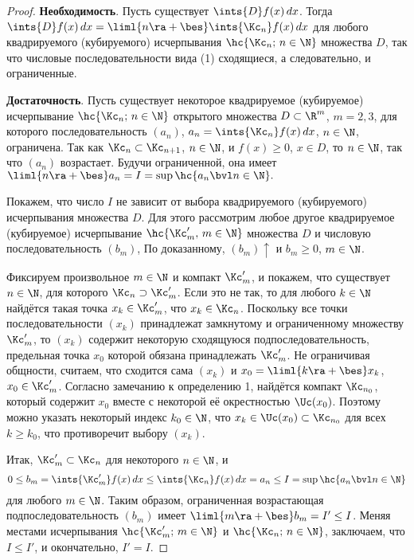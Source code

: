 \documentclass[a4paper]{article}
\begin{document}
\begin{proof}
\textbf{Необходимость}. Пусть существует $\ints{D}f(x)\,dx$. Тогда
$\ints{D}f(x)\,dx=\liml{n\ra+\bes}\ints{\Kc_n}f(x)\,dx$ для любого
квадрируемого (кубируемого) исчерпывания $\hc{\Kc_n;\,n\in\N}$
множества $D$, так что числовые последовательности вида (1)
сходящиеся, а следовательно, и ограниченные.

\textbf{Достаточность}. Пусть существует некоторое квадрируемое
(кубируемое) исчерпывание $\hc{\Kc_n;\,n\in\N}$ открытого множества
$D\subset\R^m$, $m=2,3$, для которого последовательность $(a_n)$,
$a_n=\ints{\Kc_n}f(x)\,dx$, $n\in\N$, ограничена. Так как
$\Kc_n\subset\Kc_{n+1}$, $n\in\N$, и $f(x)\ge0$, $x\in D$, то
 $n\in\N$, так что $(a_n)$ возрастает. Будучи ограниченной,
она имеет $\liml{n\ra+\bes}a_n=I=\sup\hc{a_n\bvl n\in\N}.$

Покажем, что число $I$ не зависит от выбора квадрируемого
(кубируемого) исчерпывания множества $D$. Для этого рассмотрим любое
другое квадрируемое (кубируемое) исчерпывание $\hc{\Kc'_m,
\,m\in\N}$ множества $D$ и числовую последовательность $(b_m)$,
 По доказанному,
$(b_m)\uparrow$ и $b_m\ge0$, $m\in\N$.

Фиксируем произвольное $m\in\N$ и компакт $\Kc'_m$, и покажем, что
существует $n\in\N$, для которого $\Kc_n\supset\Kc'_m$. Если это не
так, то для любого $k\in\N$ найдётся такая точка $x_k\in\Kc'_m$, что
$x_k\in\Kc_n$. Поскольку все точки последовательности $(x_k)$
принадлежат замкнутому и ограниченному множеству $\Kc'_m$, то
$(x_k)$ содержит некоторую сходящуюся подпоследовательность,
предельная точка $x_0$ которой обязана принадлежать $\Kc'_m$. Не
ограничивая общности, считаем, что сходится сама $(x_k)$ и
$x_0=\liml{k\ra+\bes} x_k$, $x_0\in\Kc'_m$. Согласно замечанию к
определению 1, найдётся компакт $\Kc_{n_0}$, который содержит $x_0$
вместе с некоторой её окрестностью $\Uc(x_0)$. Поэтому можно указать
некоторый индекс $k_0\in\N$, что $x_k\in\Uc(x_0)\subset\Kc_{n_0}$
для всех $k\ge k_0$, что противоречит выбору $(x_k)$.

Итак, $\Kc'_m\subset\Kc_n$ для некоторого $n\in\N$, и $$0\le
b_m=\ints{\Kc'_m}f(x)\,dx\le \ints{\Kc_n}f(x)\,dx=a_n\le
I=\sup\hc{a_n\bvl n\in\N}$$ для любого $m\in\N$. Таким образом,
ограниченная возрастающая подпоследовательность $(b_m)$ имеет
$\liml{m\ra+\bes}b_m=I'\le I$. Меняя местами исчерпывания
$\hc{\Kc'_m;\,m\in\N}$ и $\hc{\Kc_n;\,n\in\N}$, заключаем, что $I\le
I'$, и окончательно, $I'=I$.
\end{proof}
\end{document}
